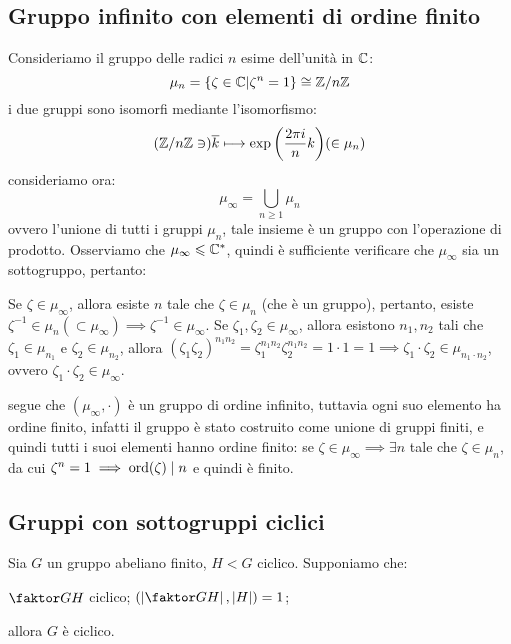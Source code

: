 \documentclass[11pt]{scrartcl}
\begin{document}
\subsection{Gruppo infinito con elementi di ordine finito}
Consideriamo il gruppo delle radici $n$ esime dell'unità in $\mathbb C$:
	\[ \mu_n = \{\zeta \in \mathbb C | \zeta^n = 1\} \cong {\mathbb Z}/n{\mathbb Z}
		\]
i due gruppi sono isomorfi mediante l'isomorfismo:
	\[ ({\mathbb Z}/n{\mathbb Z} \ni)\overline{k} \longmapsto \exp{\biggl(\frac{2\pi i}{n} k\biggr)} (\in \mu_n)
		\]
consideriamo ora:
	\[ \mu_{\infty} = \bigcup_{n \geq 1} \mu_n
		\]
ovvero l'unione di tutti i gruppi $\mu_n$, tale insieme è un gruppo con l'operazione di 
prodotto. Osserviamo che $\mu_{\infty} \leqslant \mathbb C^*$, quindi è sufficiente verificare che $\mu_{\infty}$ sia 
un sottogruppo, pertanto:
	\begin{enumerate}[(1)]
		\ii Se $\zeta \in \mu_{\infty}$, allora esiste $n$ tale che $\zeta \in \mu_n$ (che è un gruppo), pertanto,
		esiste $\zeta^{-1} \in \mu_n (\subset \mu_{\infty}) \implies \zeta^{-1} \in \mu_{\infty}$.
		\ii Se $\zeta_1,\zeta_2 \in \mu_{\infty}$, allora esistono $n_1,n_2$ tali che $\zeta_1 \in \mu_{n_1}$ e $\zeta_2 \in \mu_{n_2}$,
		allora $(\zeta_1\zeta_2)^{n_1n_2} = \zeta_1^{n_1n_2}\zeta_2^{n_1n_2} = 1 \cdot 1 = 1 \implies \zeta_1 \cdot \zeta_2 \in \mu_{n_1 \cdot n_2}$,
		ovvero $\zeta_1 \cdot \zeta_2 \in \mu_{\infty}$.
	\end{enumerate}
segue che $(\mu_{\infty}, \cdot)$ è un gruppo di ordine infinito, tuttavia ogni suo elemento ha ordine finito, infatti il gruppo è stato costruito come 
unione di gruppi finiti, e quindi tutti i suoi elementi hanno ordine finito: se $\zeta \in \mu_{\infty} \implies \exists n$ tale che $\zeta \in \mu_n$, da cui
$\zeta^n = 1 \implies \operatorname{ord}(\zeta) \mid n$ e quindi è finito.


\newpage
\subsection{Gruppi con sottogruppi ciclici}

\begin{lemma}
\label{A.23}
Sia $G$ un gruppo abeliano finito, $H < G$ ciclico. Supponiamo che:
	\begin{enumerate}[(i)]
	\ii $\faktor GH$ ciclico;
	\ii $\left( \left|\faktor GH \right| , |H| \right) = 1$;
	\end{enumerate}
allora $G$ è ciclico.
\end{lemma}
\end{document}
